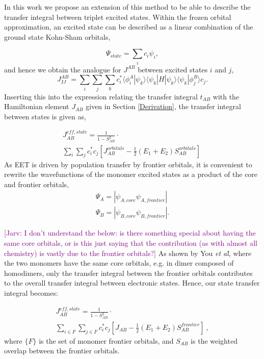 \documentclass[aps,physrev,reprint,superscriptaddress,nofootinbib,amsmath,amssymb,a4paper]{revtex4-2}
\newcommand{\jarv}[1]{\textcolor{purple}{[Jarv: #1]}}
\begin{document}
In this work we propose an extension of this method to be able to describe the transfer integral between triplet excited states. Within the frozen orbital approximation, an excited state can be described as a linear combination of the ground state Kohn-Sham orbitals,

\begin{equation}
    \Psi_{state} = \sum_i c_i\psi_i,
\end{equation}
and hence we obtain the analogue for $J^{AB}$ between excited states $i$ and $j$,
\begin{equation}
    J^{AB}_{IJ} = \sum_i\sum_j\sum_kc_i^*\langle\phi_i^A|\psi_k\rangle\langle\psi_k|H|\psi_k\rangle\langle\psi_k|\phi^B_j\rangle c_j.
\end{equation}
%
Inserting this into the expression relating the transfer integral $t_{AB}$ with the Hamiltonian element $J_{AB}$ given in Section \eqref{Derivation}, the transfer integral between states is given as,

\begin{multline}  
    J_{AB}^{eff,state} = \frac{1}{1-S_{AB}^2}\cdot \\
    \sum_i\sum_jc_i^*c_j\left[J_{AB}^{orbitals}- 
    \frac{1}{2}(E_1+E_2)S_{AB}^{orbitals}\right]\
\end{multline}
%
As EET is driven by population transfer by frontier orbitals, it is convenient to rewrite the wavefunctions of the monomer excited states as a product of the core and frontier orbitals,
\begin{align}
    \Psi_A = |\psi_{A,core}\psi_{A,frontier}| \\
    \Psi_B = |\psi_{B,core}\psi_{B,frontier}| .
\end{align}

\jarv{I don't understand the below: is there something special about having the same core orbitals, or is this just saying that the contribution (as with almost all chemistry) is vastly due to the frontier orbitals?} 
As shown by You \textit{et al\.}, where the two monomers have the same core orbitals, e.g. in dimer composed of homodimers, only the transfer integral between the frontier orbitals contributes to the overall transfer integral between electronic states.
Hence, our state transfer integral becomes:

\begin{multline}
    J_{AB}^{eff,state} = \frac{1}{1-S_{AB}^2}\cdot \\ \sum_{i\in {F}}\sum_{j\in{F}}c_i^*c_j\left[J_{AB}-\frac{1}{2}(E_1+E_2)S_{AB}^{frontier}\right]\ ,
\end{multline}
where $\{F\}$ is the set of monomer frontier orbitals, and $S_{AB}$ is the weighted overlap between the frontier orbitals. 
\end{document}
